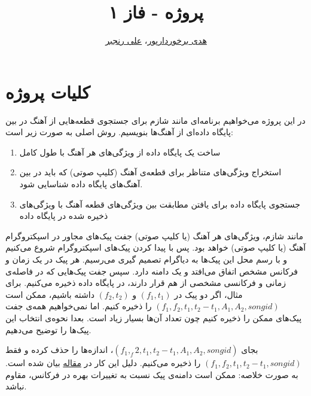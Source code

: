 \documentclass{utsignal}
\title{پروژه - فاز ۱}
\author{\href{mailto:h.barkhordarpour@ut.ac.ir?subject=[SS\%20S98 A2]}{هدی برخوردارپور}، 
\href{mailto:ranjbar.ali@ut.ac.ir?subject=[SS\%20S98 A2]\%20}{علی رنجبر}}
\begin{document}
	\maketitle
	\section*{کلیات پروژه}
	در این پروژه می‌خواهیم برنامه‌ای مانند شازم برای جستجوی قطعه‌هایی از آهنگ در بین پایگاه داده‌ای از آهنگ‌ها بنویسیم. روش اصلی به صورت زیر است:
	\begin{enumerate}
		\item ساخت یک پایگاه داده از ویژگی‌های هر آهنگ با طول کامل
		\item استخراج ویژگی‌های متناظر برای قطعه‌ی آهنگ (کلیپ صوتی) که باید در بین آهنگ‌های پایگاه داده شناسایی شود.
		\item جستجوی پایگاه داده برای یافتن مطابقت بین ویژگی‌‌های قطعه آهنگ با ویژگی‌های ذخیره شده در پایگاه داده
	\end{enumerate}
	مانند شازم، ویژگی‌های هر آهنگ (یا کلیپ صوتی) جفت پیک‌های مجاور در اسپکتروگرام آهنگ (یا کلیپ صوتی) خواهد بود. پس با پیدا کردن پیک‌های اسپکتروگرام شروع می‌کنیم و با رسم محل این پیک‌ها به دیاگرام تصمیم گیری  می‌رسیم. هر پیک در یک زمان و فرکانس مشخص	  اتفاق می‌افتد و یک دامنه  دارد. سپس جفت پیک‌هایی که در فاصله‌ی زمانی و فرکانسی مشخصی از هم قرار دارند، در پایگاه داده ذخیره می‌کنیم. برای مثال، اگر دو پیک در $(f_1, t_1)$ و $(f_2, t_2)$ داشته باشیم، ممکن است $(f_1, f_2, t_1, t_2-t_1,A_1,A_2,songid)$ را ذخیره کنیم. اما نمی‌خواهیم همه‌ی جفت پیک‌های ممکن را ذخیره کنیم چون تعداد آن‌ها بسیار زیاد است. بعدا نحوه‌ی انتخاب این پیک‌ها را توضیح می‌دهیم.
	
	بجای $(f_1, _f2, t_1, t_2-t_1,A_1,A_2,songid)$، اندازه‌ها را حذف کرده و فقط $(f_1, f_2, t_1, t_2-t_1,songid)$ را ذخیره می‌کنیم. دلیل این کار در \href{https://www.ee.columbia.edu/~dpwe/papers/Wang03-shazam.pdf}{مقاله} بیان شده است. به صورت خلاصه: ممکن است دامنه‌ی پیک نسبت به تغییرات بهره در فرکانس، مقاوم نباشد.
	
\end{document}
